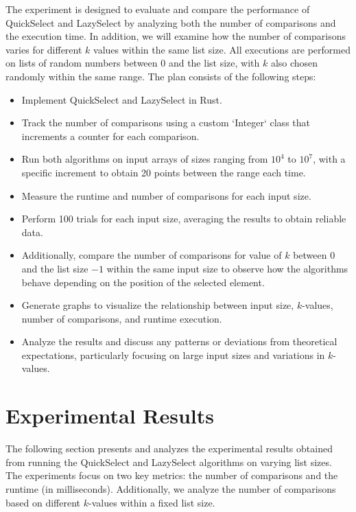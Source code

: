 \documentclass{article}
\begin{document}
The experiment is designed to evaluate and compare the performance of QuickSelect and LazySelect by analyzing both the number of comparisons and the execution time. In addition, we will examine how the number of comparisons varies for different \(k\) values within the same list size. All executions are performed on lists of random numbers between 0 and the list size, with \(k\) also chosen randomly within the same range. The plan consists of the following steps:

\begin{itemize}
    \item Implement QuickSelect and LazySelect in Rust.
    \item Track the number of comparisons using a custom `Integer` class that increments a counter for each comparison.
    \item Run both algorithms on input arrays of sizes ranging from \(10^4\) to \(10^7\), with a specific increment to obtain 20 points between the range each time.
    \item Measure the runtime and number of comparisons for each input size.
    \item Perform 100 trials for each input size, averaging the results to obtain reliable data.
    \item Additionally, compare the number of comparisons for value of \(k\) between $0$ and the list size $-1$ within the same input size to observe how the algorithms behave depending on the position of the selected element.
    \item Generate graphs to visualize the relationship between input size, \(k\)-values, number of comparisons, and runtime execution.
    \item Analyze the results and discuss any patterns or deviations from theoretical expectations, particularly focusing on large input sizes and variations in \(k\)-values.
\end{itemize}

\section{Experimental Results}

The following section presents and analyzes the experimental results obtained from running the QuickSelect and LazySelect algorithms on varying list sizes. The experiments focus on two key metrics: the number of comparisons and the runtime (in milliseconds). Additionally, we analyze the number of comparisons based on different \(k\)-values within a fixed list size.
\end{document}

